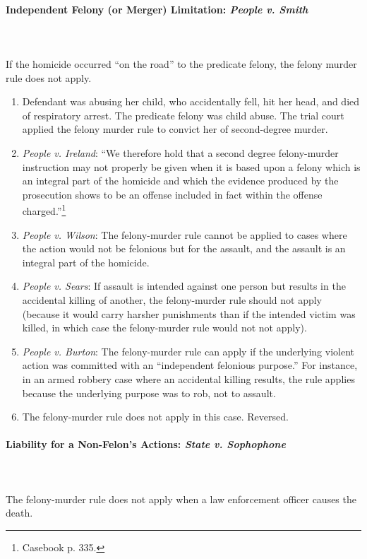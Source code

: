 \paragraph{Independent Felony (or Merger) Limitation: \emph{People v. Smith}}
~\\\\
If the homicide occurred ``on the road'' to the predicate felony, the felony 
murder rule does not apply. %

\begin{enumerate}
    \item Defendant was abusing her child, who accidentally fell, hit her 
    head, and died of respiratory arrest. The predicate felony was child 
    abuse. The trial court applied the felony 
    murder rule to convict her of second-degree murder.
    \item \emph{People v. Ireland}: ``We therefore hold that a second degree 
    felony-murder instruction may not properly be given when it is based upon 
    a felony which is an integral part of the homicide and which the evidence 
    produced by the prosecution shows to be an offense included in fact within 
    the offense charged.''\footnote{Casebook p. 335.}
    \item \emph{People v. Wilson}: The felony-murder rule cannot be applied to 
    cases where the action would not be felonious but for the assault, and the 
    assault is an integral part of the homicide.
    \item \emph{People v. Sears}: If assault is intended against one person 
    but results in the accidental killing of another, the felony-murder rule 
    should not apply (because it would carry harsher punishments than if the 
    intended victim was killed, in which case the felony-murder rule would not 
    not apply).
    \item \emph{People v. Burton}: The felony-murder rule can apply if the 
    underlying violent action was committed with an ``independent felonious 
    purpose.'' For instance, in an armed robbery case where an accidental 
    killing results, the rule applies because the underlying purpose was to 
    rob, not to assault.
    \item The felony-murder rule does not apply in this case. Reversed.
\end{enumerate}

\paragraph{Liability for a Non-Felon's Actions: \emph{State v. Sophophone}}
~\\\\
The felony-murder rule does not apply when a law enforcement officer causes 
the death.

